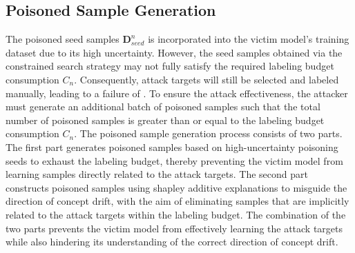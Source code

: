 \subsection{Poisoned Sample Generation}
\label{Sec: Poisoned Sample Generation}
The poisoned seed samples $\bm{D}_{seed}^{n}$ is incorporated into the victim model’s training dataset due to its high uncertainty.
However, the seed samples obtained via the constrained search strategy may not fully satisfy the required labeling budget consumption $C_{n}$.
Consequently, attack targets will still be selected and labeled manually, leading to a failure of \pandora.
To ensure the attack effectiveness, the attacker must generate an additional batch of poisoned samples such that the total number of poisoned samples is greater than or equal to the labeling budget consumption $C_{n}$.
The poisoned sample generation process consists of two parts.
The first part generates poisoned samples based on high-uncertainty poisoning seeds to exhaust the labeling budget, thereby preventing the victim model from learning samples directly related to the attack targets.
The second part constructs poisoned samples using shapley additive explanations to misguide the direction of concept drift, with the aim of eliminating samples that are implicitly related to the attack targets within the labeling budget.
The combination of the two parts prevents the victim model from effectively learning the attack targets while also hindering its understanding of the correct direction of concept drift.

